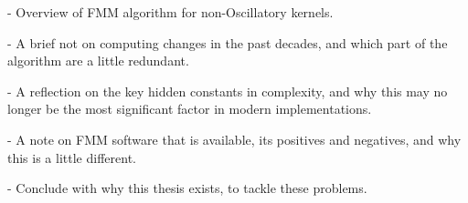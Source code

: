 - Overview of FMM algorithm for non-Oscillatory kernels.

- A brief not on computing changes in the past decades, and which part of the algorithm are a little redundant.

- A reflection on the key hidden constants in complexity, and why this may no longer be the most significant factor in modern implementations.

- A note on FMM software that is available, its positives and negatives, and why this is a little different.

- Conclude with why this thesis exists, to tackle these problems.
